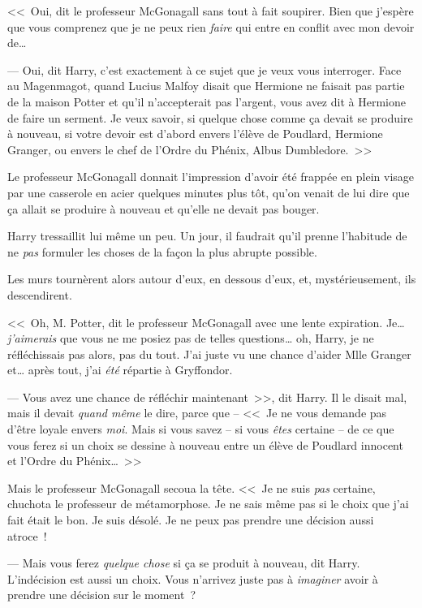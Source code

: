 <<~Oui, dit le professeur McGonagall sans tout à fait soupirer. Bien que j'espère que vous comprenez que je ne peux rien \emph{faire} qui entre en conflit avec mon devoir de…

--- Oui, dit Harry, c'est exactement à ce sujet que je veux vous interroger. Face au Magenmagot, quand Lucius Malfoy disait que Hermione ne faisait pas partie de la maison Potter et qu'il n'accepterait pas l'argent, vous avez dit à Hermione de faire un serment. Je veux savoir, si quelque chose comme ça devait se produire à nouveau, si votre devoir est d'abord envers l'élève de Poudlard, Hermione Granger, ou envers le chef de l'Ordre du Phénix, Albus Dumbledore.~>>

Le professeur McGonagall donnait l'impression d'avoir été frappée en plein visage par une casserole en acier quelques minutes plus tôt, qu'on venait de lui dire que ça allait se produire à nouveau et qu'elle ne devait pas bouger.

Harry tressaillit lui même un peu. Un jour, il faudrait qu'il prenne l'habitude de ne \emph{pas} formuler les choses de la façon la plus abrupte possible.

Les murs tournèrent alors autour d'eux, en dessous d'eux, et, mystérieusement, ils descendirent.

<<~Oh, M. Potter, dit le professeur McGonagall avec une lente expiration. Je… \emph{j'aimerais} que vous ne me posiez pas de telles questions… oh, Harry, je ne réfléchissais pas alors, pas du tout. J'ai juste vu une chance d'aider Mlle Granger et… après tout, j'ai \emph{été} répartie à Gryffondor.

--- Vous avez une chance de réfléchir maintenant~>>, dit Harry. Il le disait mal, mais il devait \emph{quand même} le dire, parce que -- <<~Je ne vous demande pas d'être loyale envers \emph{moi}. Mais si vous savez -- si vous \emph{êtes} certaine -- de ce que vous ferez si un choix se dessine à nouveau entre un élève de Poudlard innocent et l'Ordre du Phénix…~>>

Mais le professeur McGonagall secoua la tête. <<~Je ne suis \emph{pas} certaine, chuchota le professeur de métamorphose. Je ne sais même pas si le choix que j'ai fait était le bon. Je suis désolé. Je ne peux pas prendre une décision aussi atroce~!

--- Mais vous ferez \emph{quelque chose} si ça se produit à nouveau, dit Harry. L'indécision est aussi un choix. Vous n'arrivez juste pas à \emph{imaginer} avoir à prendre une décision sur le moment~?

